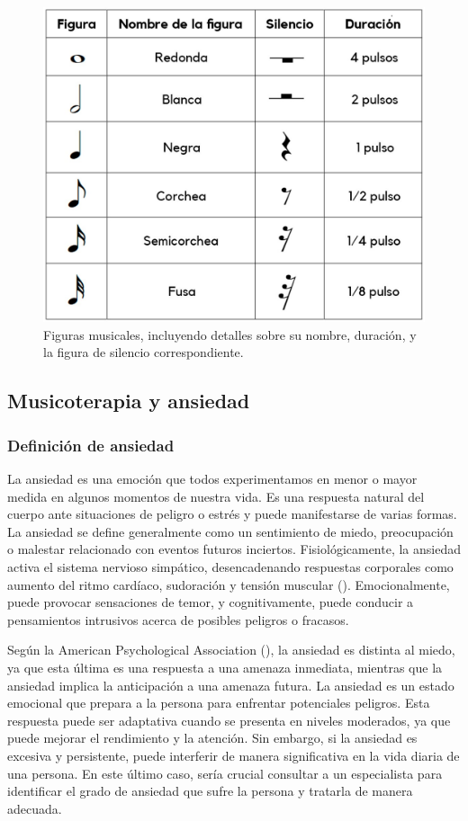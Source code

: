 \begin{figure}[h!]
	\centering
	\includegraphics[width=0.4\linewidth]{Figuras/Estado/FigurasMusicales.jpg}
	\caption{Figuras musicales, incluyendo detalles sobre su nombre, duración, y la figura de silencio correspondiente.}
	\label{fig:MusicalFigures}
\end{figure}



\subsection{Musicoterapia y ansiedad}

\subsubsection{Definición de ansiedad}

La ansiedad es una emoción que todos experimentamos en menor o mayor medida en algunos momentos de nuestra vida. Es una respuesta natural del cuerpo ante situaciones de peligro o estrés y puede manifestarse de varias formas. La ansiedad se define generalmente como un sentimiento de miedo, preocupación o malestar relacionado con eventos futuros inciertos. Fisiológicamente, la ansiedad activa el sistema nervioso simpático, desencadenando respuestas corporales como aumento del ritmo cardíaco, sudoración y tensión muscular (\cite{APA:2013}). Emocionalmente, puede provocar sensaciones de temor, y cognitivamente, puede conducir a pensamientos intrusivos acerca de posibles peligros o fracasos.

Según la American Psychological Association (\citeyear{APA:2020}), la ansiedad es distinta al miedo, ya que esta última es una respuesta a una amenaza inmediata, mientras que la ansiedad implica la anticipación a una amenaza futura. La ansiedad es un estado emocional que prepara a la persona para enfrentar potenciales peligros. Esta respuesta puede ser adaptativa cuando se presenta en niveles moderados, ya que puede mejorar el rendimiento y la atención. Sin embargo, si la ansiedad es excesiva y persistente, puede interferir de manera significativa en la vida diaria de una persona. En este último caso, sería crucial consultar a un especialista para identificar el grado de ansiedad que sufre la persona y tratarla de manera adecuada.

